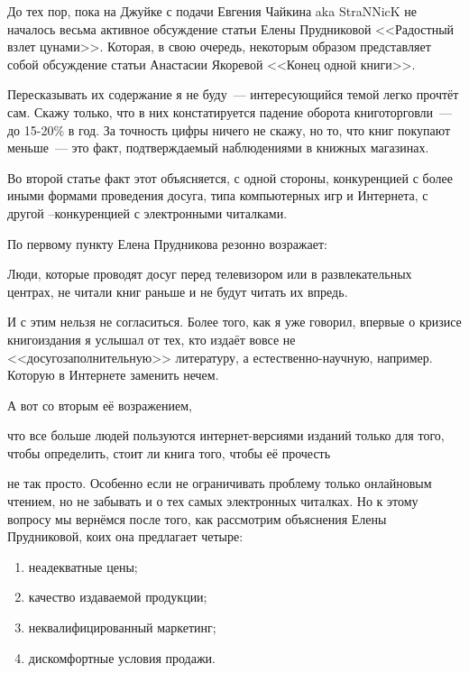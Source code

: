 До тех пор, пока на Джуйке с подачи Евгения Чайкина aka StraNNicK не началось весьма активное обсуждение статьи Елены Прудниковой <<Радостный взлет цунами>>. Которая, в свою очередь, некоторым образом представляет собой обсуждение статьи Анастасии Якоревой <<Конец одной книги>>.

Пересказывать их содержание я не буду~--- интересующийся темой легко прочтёт сам. Скажу только, что в них констатируется падение оборота книготорговли~--- до 15-20\% в год. За точность цифры ничего не скажу, но то, что книг покупают меньше~--- это факт, подтверждаемый наблюдениями в книжных магазинах.

Во второй статье факт этот объясняется, с одной стороны, конкуренцией с более иными формами проведения досуга, типа компьютерных игр и Интернета, с другой --конкуренцией с электронными читалками.

По первому пункту Елена Прудникова резонно возражает:


\begin{shadequote}{}
Люди, которые проводят досуг перед телевизором или в развлекательных центрах, не читали книг раньше и не будут читать их впредь.
\end{shadequote}

И с этим нельзя не согласиться. Более того, как я уже говорил, впервые о кризисе книгоиздания я услышал от тех, кто издаёт вовсе не <<досугозаполнительную>> литературу, а естественно-научную, например. Которую в Интернете заменить нечем.

А вот со вторым её возражением,


\begin{shadequote}{}
что все больше людей пользуются интернет-версиями изданий только для того, чтобы определить, стоит ли книга того, чтобы её прочесть
\end{shadequote}

 не так просто. Особенно если не ограничивать проблему только онлайновым чтением, но не забывать и о тех самых электронных читалках. Но к этому вопросу мы вернёмся после того, как рассмотрим объяснения Елены Прудниковой, коих она предлагает четыре:
\begin{enumerate}
	\item неадекватные цены; 
	\item качество издаваемой продукции;
	\item неквалифицированный маркетинг; 
	\item дискомфортные условия продажи.
\end{enumerate}

